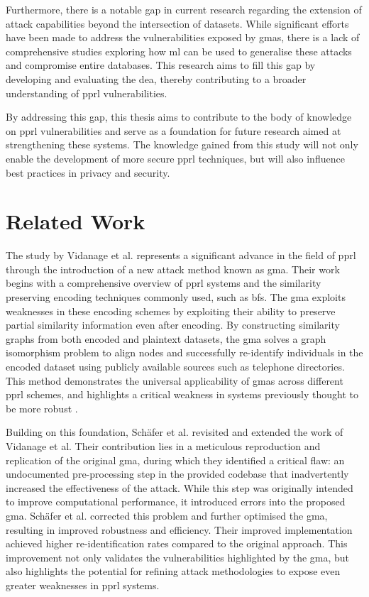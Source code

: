 Furthermore, there is a notable gap in current research regarding the extension of attack capabilities beyond the intersection of datasets.
While significant efforts have been made to address the vulnerabilities exposed by \ac{gma}s, there is a lack of comprehensive studies exploring how \ac{ml} can be used to generalise these attacks and compromise entire databases.
This research aims to fill this gap by developing and evaluating the \ac{dea}, thereby contributing to a broader understanding of \ac{pprl} vulnerabilities.

By addressing this gap, this thesis aims to contribute to the body of knowledge on \ac{pprl} vulnerabilities and serve as a foundation for future research aimed at strengthening these systems.
The knowledge gained from this study will not only enable the development of more secure \ac{pprl} techniques, but will also influence best practices in privacy and security.

\section{Related Work}  \label{sec:rel-work}

The study by Vidanage et al. \cite{vidanage2020graph} represents a significant advance in the field of \ac{pprl} through the introduction of a new attack method known as \ac{gma}.
Their work begins with a comprehensive overview of \ac{pprl} systems and the similarity preserving encoding techniques commonly used, such as \ac{bf}s.
The \ac{gma} exploits weaknesses in these encoding schemes by exploiting their ability to preserve partial similarity information even after encoding.
By constructing similarity graphs from both encoded and plaintext datasets, the \ac{gma} solves a graph isomorphism problem to align nodes and successfully re-identify individuals in the encoded dataset using publicly available sources such as telephone directories.
This method demonstrates the universal applicability of \ac{gma}s across different \ac{pprl} schemes, and highlights a critical weakness in systems previously thought to be more robust \cite{vidanage2020graph}.

Building on this foundation, Schäfer et al. \cite{schaefer2024} revisited and extended the work of Vidanage et al.
Their contribution lies in a meticulous reproduction and replication of the original \ac{gma}, during which they identified a critical flaw: an undocumented pre-processing step in the provided codebase that inadvertently increased the effectiveness of the attack.
While this step was originally intended to improve computational performance, it introduced errors into the proposed \ac{gma}.
Schäfer et al. corrected this problem and further optimised the \ac{gma}, resulting in improved robustness and efficiency.
Their improved implementation achieved higher re-identification rates compared to the original approach.
This improvement not only validates the vulnerabilities highlighted by the \ac{gma}, but also highlights the potential for refining attack methodologies to expose even greater weaknesses in \ac{pprl} systems.

